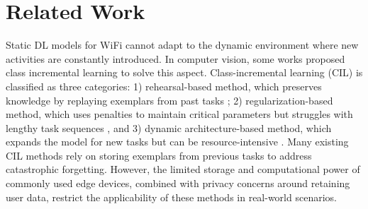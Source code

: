 \section{Related Work}

Static DL models for WiFi cannot adapt to the dynamic environment where new activities are constantly introduced.
In computer vision, some works proposed class incremental learning to solve this aspect.
Class-incremental learning (CIL) is classified as three categories: 1) rehearsal-based method, which preserves knowledge by replaying exemplars from past tasks \cite{rebuffi2017icarl, hou2019learning, wu2019large}; 2) regularization-based method, which uses penalties to maintain critical parameters but struggles with lengthy task sequences \cite{kirkpatrick2017overcoming, yang2021cost, saha2021gradient}, and 3) dynamic architecture-based method, which expands the model for new tasks but can be resource-intensive \cite{rusu2016progressive, verma2021efficient, douillard2022dytox}. 
Many existing CIL methods rely on storing exemplars from previous tasks to address catastrophic forgetting. However, the limited storage and computational power of commonly used edge devices, combined with privacy concerns around retaining user data, restrict the applicability of these methods in real-world scenarios.

